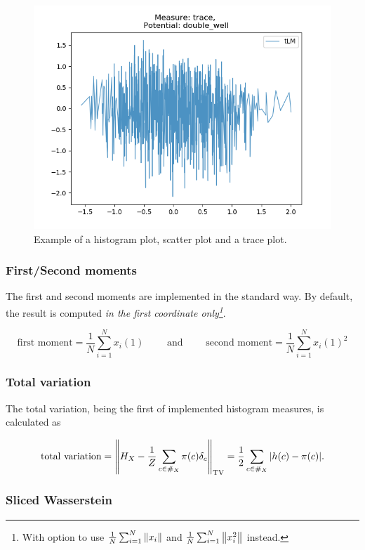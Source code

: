 \begin{figure}[H]
\begin{minipage}[b]{0.3\textwidth}
  \end{minipage} %
  \begin{minipage}[b]{0.3\textwidth}
  \centering
    \includegraphics[width=\textwidth]{Figures/trace_example.png}
  \end{minipage}
   \caption{Example of a histogram plot, scatter plot and a trace plot.}
\end{figure}



\subsubsection{First/Second moments}
The first and second moments are implemented in the standard way. By default, the result is computed \textit{in the first coordinate only\footnote{With option to use $\frac 1 N\sum_{i=1}^N \norm{x_i}$ and $\frac 1 N\sum_{i=1}^N \norm{x_i^2}$ instead.}}.

$$ 
    \text{first moment} = \frac 1 N\sum_{i=1}^N x_i(1) \qquad \text{ and } \qquad \text{second moment} = \frac 1 N\sum_{i=1}^N x_i(1)^2
$$


\subsubsection{Total variation}
The total variation, being the first of implemented histogram measures, is calculated as

\[\text{total variation} = \norm{H_X - \frac 1 Z \sum_{c \in \#_X} \pi(c) \delta_c}_{\text{TV}} = \frac 1 2\sum_{c \in \#_X} |h(c) - \pi(c)| .\]


\subsubsection{Sliced Wasserstein}


